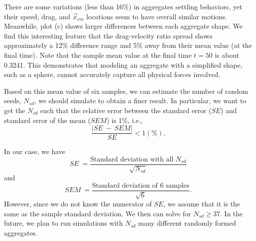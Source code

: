 There are some variations (less than 16\%) in aggregates settling behaviors, yet their speed, drag, and $\vec{x}_{cm}$ locations seem to have overall similar motions. 
Meanwhile, plot (c) shows larger differences between each aggregate shape. 
We find this interesting feature that the drag-velocity ratio spread shows approximately a 12\% difference range and 5\% away from their mean value (at the final time). 
Note that the sample mean value at the final time $t = 50$ is about 0.3241.
This demonstrates that modeling an aggregate with a simplified shape, such as a sphere, cannot accurately capture all physical forces involved.
\par
Based on this mean value of six samples, we can estimate the number of random seeds, $N_{sd}$, we should simulate to obtain a finer result. In particular, we want to get the $N_{sd}$ such that the relative error between the standard error ($SE$) and standard error of the mean ($SEM$) is 1\%, i.e.,
\begin{equation}
	\frac{|SE \ - \ SEM|}{SE} < 1 (\%).	
\end{equation}

In our case, we have
\begin{equation}
	SE \ = \frac{\text{Standard deviation with all  } N_{sd}}{\sqrt{N_{sd}}}
\end{equation}
and
\begin{equation}
	SEM \ = \frac{\text{Standard deviation of 6 samples}}{\sqrt{6}}.
\end{equation}
However, since we do not know the numerator of $SE$, we assume that it is the same as the sample standard deviation. We then can solve for $N_{sd} \geq 37$. In the future, we plan to run simulations with $N_{sd}$ many different randomly formed aggregates. 

